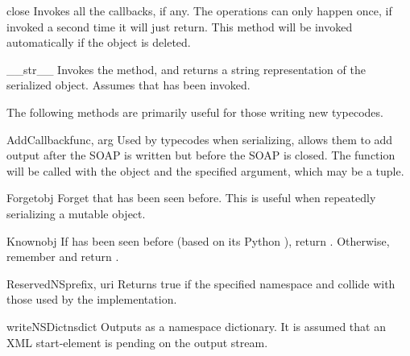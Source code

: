 \begin{methoddesc}{close}{}
Invokes all the callbacks, if any.  The  operations can only
happen once, if invoked a second time it will just return. This method will be
invoked automatically if the object is deleted.
\end{methoddesc}


\begin{methoddesc}{__str__}{}
Invokes the  method, and returns a string representation of the
serialized object.  Assumes that  has been invoked.
\end{methoddesc}

The following methods are primarily useful for those writing new typecodes.

\begin{methoddesc}{AddCallback}{func, arg}
Used by typecodes when serializing, allows them to add output after
the SOAP  is written but before the SOAP  is closed.
The function 
will be called with the  object and the specified 
argument, which may be a tuple.
\end{methoddesc}

\begin{methoddesc}{Forget}{obj}
Forget that  has been seen before.
This is useful when repeatedly serializing a mutable object.
\end{methoddesc}

\begin{methoddesc}{Known}{obj}
If  has been seen before (based on its Python ), return
.  Otherwise, remember  and return .
\end{methoddesc}

\begin{methoddesc}{ReservedNS}{prefix, uri}
Returns true if the specified namespace  and  collide
with those used by the implementation.
\end{methoddesc}

\begin{methoddesc}{writeNSDict}{nsdict}
Outputs  as a namespace dictionary.
It is assumed that an XML start-element is pending on the output
stream.
\end{methoddesc}

